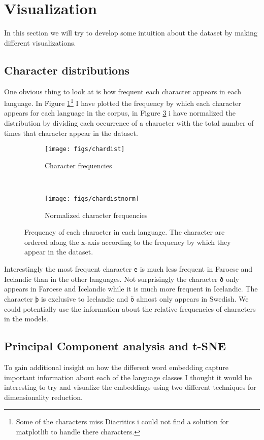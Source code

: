 \section{Visualization}
In this section we will try to develop some intuition about the dataset by making different visualizations.

\subsection{Character distributions}
One obvious thing to look at is how frequent each character appears in each language.
In Figure \ref{chardist}\footnote{Some of the characters miss Diacritics i could not find a solution for matplotlib to handle there characters.} I have plotted the frequency by which each character appears for each language in the corpus, in Figure \ref{chardistnorm} i have normalized the distribution by dividing each occurrence of a character with the total number of times that character appear in the dataset.\\
\begin{figure}[h!]
    \centering
    \begin{subfigure}[b]{0.45\textwidth}
        \texttt{[image: figs/chardist]}
        \caption{Character frequencies}
        \label{chardist}
    \end{subfigure}
    ~
    \begin{subfigure}[b]{0.45\textwidth}
        \texttt{[image: figs/chardistnorm]}
        \caption{Normalized character frequencies}
        \label{chardistnorm}
    \end{subfigure}
    \caption{Frequency of each character in each language. The character are ordered along the x-axis according to the frequency by which they appear in the dataset. }
\end{figure}

Interestingly the most frequent character {\tt e} is much less frequent in Faroese and Icelandic than in the other languages. Not surprisingly the character  {\tt ð} only appears in Faroese and Icelandic while it is much more frequent in Icelandic. The character {\tt þ} is exclusive to Icelandic and  {\tt ö} almost only appears in Swedish. We could potentially use the information about the relative frequencies of characters in the models.


\subsection{Principal Component analysis and t-SNE}
To gain additional insight on how the different word embedding capture important information about each of the language classes I thought it would be interesting to try and visualize the embeddings using two different techniques for dimensionality reduction.\\

